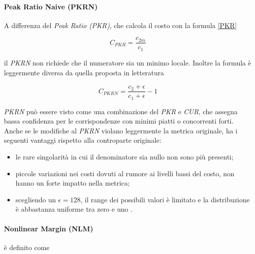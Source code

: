 \documentclass[12pt]{report}
\begin{document}
			\paragraph{Peak Ratio Naive (PKRN)} 
			\label{par:PKRN}
		
				A differenza del \textit{Peak Ratio (PKR)}, che calcola il costo con la formula \ref{PKR}
		
				\begin{equation}
					C_{PKR}=\frac{c_{2m}}{c_{1}}
					\label{PKR}
				\end{equation}
			
				\noindent il \textit{PKRN} non richiede che il numeratore sia un minimo locale. Inoltre la formula è leggermente diversa da quella proposta in letteratura \cite{mercedes}
			
				\begin{equation}
					C_{PKRN}=\frac{c_{2} + \epsilon}{c_{1} + \epsilon} - 1
					\label{PKRN}
				\end{equation}
		
				\noindent \textit{PKRN} può essere visto come una combinazione del \textit{PKR} e \textit{CUR}, che assegna bassa confidenza per le corrispondenze con minimi piatti o concorrenti forti. Anche se le modifiche al \textit{PKRN} violano leggermente la metrica originale, ha i seguenti vantaggi rispetto alla controparte originale:
				
				\begin{itemize}
						
							\item le rare singolarità in cui il denominatore sia nullo non sono più presenti;
							
							\item piccole variazioni nei costi dovuti al rumore ai livelli bassi del costo, non hanno un forte impatto nella metrica; 
							
							\item scegliendo un $\epsilon=128$, il range dei possibili valori è limitato e la distribuzione è abbastanza uniforme tra zero e uno \cite{mercedes}.
							
				\end{itemize}
				
			
			\paragraph{Nonlinear Margin (NLM)}
			\label{par:NLM}
			
				è definito come
				
\end{document}
